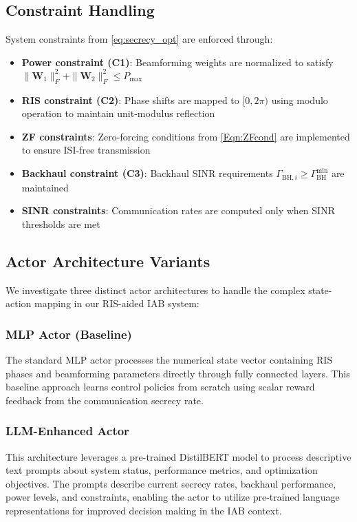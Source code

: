 \subsection{Constraint Handling}

System constraints from \eqref{eq:secrecy_opt} are enforced through:
\begin{itemize}
\item \textbf{Power constraint (C1)}: Beamforming weights are normalized to satisfy $\|\mathbf{W}_1\|_F^2 + \|\mathbf{W}_2\|_F^2 \leq P_{\max}$
\item \textbf{RIS constraint (C2)}: Phase shifts are mapped to $[0, 2\pi)$ using modulo operation to maintain unit-modulus reflection
\item \textbf{ZF constraints}: Zero-forcing conditions from \eqref{Eqn:ZFcond} are implemented to ensure ISI-free transmission
\item \textbf{Backhaul constraint (C3)}: Backhaul SINR requirements $\Gamma_{\text{BH},i} \geq \Gamma_{\text{BH}}^{\min}$ are maintained
\item \textbf{SINR constraints}: Communication rates are computed only when SINR thresholds are met
\end{itemize}

\subsection{Actor Architecture Variants}

We investigate three distinct actor architectures to handle the complex state-action mapping in our RIS-aided IAB system:

\subsubsection{MLP Actor (Baseline)}
The standard MLP actor processes the numerical state vector containing RIS phases and beamforming parameters directly through fully connected layers. This baseline approach learns control policies from scratch using scalar reward feedback from the communication secrecy rate.

\subsubsection{LLM-Enhanced Actor}
This architecture leverages a pre-trained DistilBERT model to process descriptive text prompts about system status, performance metrics, and optimization objectives. The prompts describe current secrecy rates, backhaul performance, power levels, and constraints, enabling the actor to utilize pre-trained language representations for improved decision making in the IAB context.

